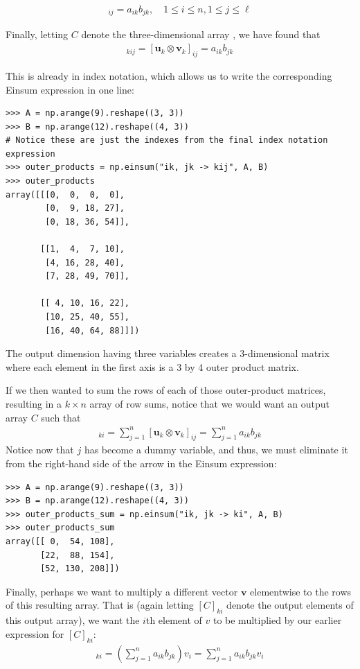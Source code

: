 \begin{align*}
	[\mathbf{u}_k \otimes \mathbf{v}_k]_{ij} = a_{ik} b_{jk}, \quad 1 \leq i \leq n, 1 \leq j \leq \ell
\end{align*}

Finally, letting $C$ denote the three-dimensional array , we have found that
\begin{align*}
	[C]_{kij} = [\mathbf{u}_k \otimes \mathbf{v}_k]_{ij} =  a_{ik} b_{jk}
\end{align*}

This is already in index notation, which allows us to write the corresponding Einsum expression in one line:

\begin{lstlisting}
>>> A = np.arange(9).reshape((3, 3))
>>> B = np.arange(12).reshape((4, 3))
# Notice these are just the indexes from the final index notation expression
>>> outer_products = np.einsum("ik, jk -> kij", A, B)
>>> outer_products
array([[[0,  0,  0,  0],
        [0,  9, 18, 27],
        [0, 18, 36, 54]],

       [[1,  4,  7, 10],
        [4, 16, 28, 40],
        [7, 28, 49, 70]],

       [[ 4, 10, 16, 22],
        [10, 25, 40, 55],
        [16, 40, 64, 88]]])
\end{lstlisting}

The output dimension having three variables creates a 3-dimensional matrix where each element in the first axis is a 3 by 4 outer product matrix.

If we then wanted to sum the rows of each of those outer-product matrices, resulting in a $k \times n$ array of row sums, notice that we would want an output array $C$ such that
\begin{align*}
	[C]_{ki} = \sum_{j=1}^{n} [\mathbf{u}_k \otimes \mathbf{v}_k]_{ij} =  \sum_{j=1}^{n} a_{ik} b_{jk}
\end{align*}
Notice now that $j$ has become a dummy variable, and thus, we must eliminate it from the right-hand side of the arrow in the Einsum expression:
\begin{lstlisting}
>>> A = np.arange(9).reshape((3, 3))
>>> B = np.arange(12).reshape((4, 3))
>>> outer_products_sum = np.einsum("ik, jk -> ki", A, B)
>>> outer_products_sum
array([[ 0,  54, 108],
       [22,  88, 154],
       [52, 130, 208]])
\end{lstlisting}

Finally, perhaps we want to multiply a different vector $\mathbf{v}$ elementwise to the rows of this resulting  array.
That is (again letting $[C]_{ki}$ denote the output elements of this output array), we want the $i$th element of $v$ to be multiplied by our earlier expression for $[C]_{ki}$:
\begin{align*}
[C]_{ki} = \left(\sum_{j=1}^{n} a_{ik} b_{jk} \right)v_i = \sum_{j=1}^{n} a_{ik} b_{jk} v_i
\end{align*}

